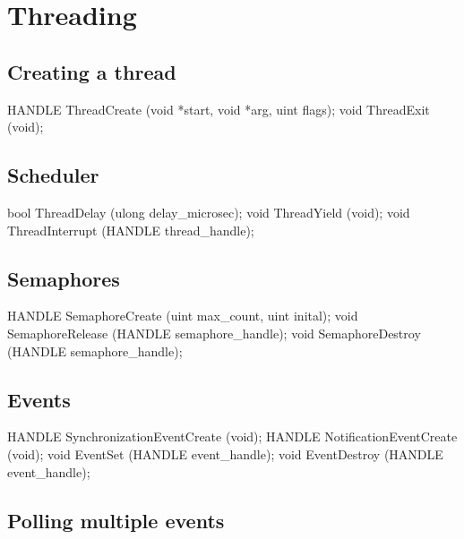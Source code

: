 \section{Threading}
\label{sec:abi:thread}


\subsection*{Creating a thread}

\begin{paldef}
HANDLE ThreadCreate (void *start, void *arg, uint flags);
void ThreadExit (void);
\end{paldef}




\subsection*{Scheduler}

\begin{paldef}
bool ThreadDelay     (ulong delay_microsec);
void ThreadYield     (void);
void ThreadInterrupt (HANDLE thread_handle);
\end{paldef}



\subsection*{Semaphores}

\begin{paldef}
HANDLE SemaphoreCreate  (uint max_count, uint inital);
void   SemaphoreRelease (HANDLE semaphore_handle);
void   SemaphoreDestroy (HANDLE semaphore_handle);
\end{paldef}


\subsection*{Events}


\begin{paldef}
HANDLE SynchronizationEventCreate (void);
HANDLE NotificationEventCreate    (void);
void EventSet     (HANDLE event_handle);
void EventDestroy (HANDLE event_handle);
\end{paldef}



\subsection*{Polling multiple events}


